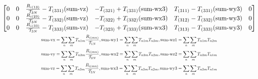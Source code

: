 \begin{landscape}
\begin{equation}
\begin{gathered}
{\begin{bmatrix}
    0 & 0 & \frac{R_{i(13)}}{\mathcal{T}_{3N}} -T_{(331)}(\text{sum-vz}) & - T_{(321)} + T_{(331)}(\text{sum-wx3}) & T_{(311)} - T_{(331)}(\text{sum-wy3})& 0 \\
    0 & 0 & \frac{R_{i(23)}}{\mathcal{T}_{3N}} -T_{(332)}(\text{sum-vz}) & - T_{(322)} + T_{(332)}(\text{sum-wx3}) & T_{(312)} - T_{(332)}(\text{sum-wy3})& 0 \\
    0 & 0 & \frac{R_{i(33)}}{\mathcal{T}_{3N}} -T_{(333)}(\text{sum-vz}) & - T_{(323)} + T_{(333)}(\text{sum-wx3}) & T_{(313)} - T_{(333)}(\text{sum-wy3})& 0
  \end{bmatrix}
}\\
\scalemath{0.70}{
  \text{sum-vx} = \sum_n \sum_m T_{n1m}\frac{R_{i(mn)}}{\mathcal{T}_{1N}}, \text{sum-wy1} = \sum_n \sum_{m}T_{n1m}T_{n3m}, \text{sum-wz1} = \sum_n \sum_{m}T_{n1m}T_{n2m}
}\\
\scalemath{0.70}{
  \text{sum-vy} = \sum_n \sum_m T_{n2m}\frac{R_{i(mn)}}{\mathcal{T}_{2N}}, \text{sum-wx2} = \sum_n \sum_{m}T_{n2m}T_{n3m}, \text{sum-wz2} = \sum_n \sum_{m}T_{n2m}T_{n1m}
}\\
\scalemath{0.70}{
  \text{sum-vz} = \sum_n \sum_m T_{n3m}\frac{R_{i(mn)}}{\mathcal{T}_{3N}}, \text{sum-wx3} = \sum_n \sum_{m}T_{n3m}T_{n2m}, \text{sum-wy3} = \sum_n \sum_{m}T_{n3m}T_{n1m}
}
\end{gathered}\label{eq:interactionmatrixnormalized}
\end{equation}
\end{landscape}
\clearpage

